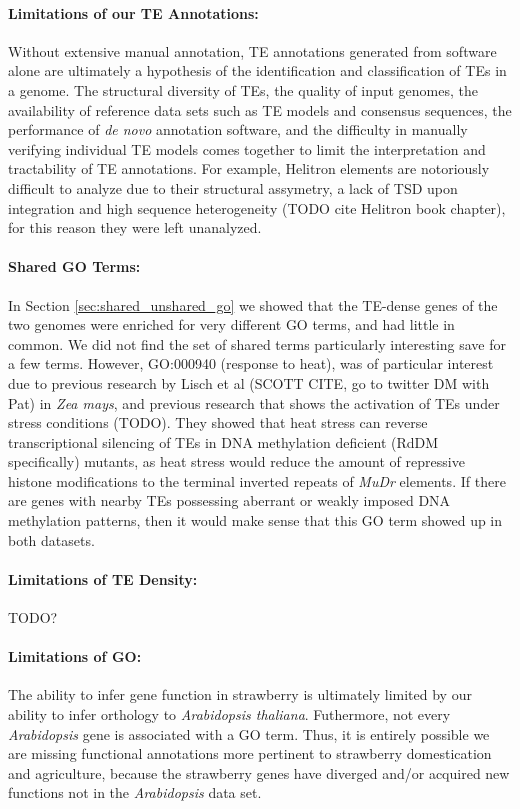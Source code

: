 \documentclass[fleqn,10pt]{olplainarticle}
\begin{document}
\paragraph{Limitations of our TE Annotations:}
Without extensive manual annotation, TE annotations generated from software alone are ultimately a hypothesis of the identification and classification of TEs in a genome.
The structural diversity of TEs, the quality of input genomes, the availability of reference data sets such as TE models and consensus sequences, the performance of \textit{de novo} annotation software, and the difficulty in manually verifying individual TE models comes together to limit the interpretation and tractability of TE annotations. 
For example, Helitron elements are notoriously difficult to analyze due to their structural assymetry, a lack of TSD upon integration and high sequence heterogeneity (TODO cite Helitron book chapter), for this reason they were left unanalyzed.

\paragraph{Shared GO Terms:}
In Section \ref{sec:shared_unshared_go} we showed that the TE-dense genes of the two genomes were enriched for very different GO terms, and had little in common.
We did not find the set of shared terms particularly interesting save for a few terms.
However, GO:000940 (response to heat), was of particular interest due to previous research by Lisch et al (SCOTT CITE, go to twitter DM with Pat) in \textit{Zea mays}, and previous research that shows the activation of TEs under stress conditions (TODO).
They showed that heat stress can reverse transcriptional silencing of TEs in DNA methylation deficient (RdDM specifically) mutants, as heat stress would reduce the amount of repressive histone modifications to the terminal inverted repeats of \textit{MuDr} elements.
If there are genes with nearby TEs possessing aberrant or weakly imposed DNA methylation patterns, then it would make sense that this GO term showed up in both datasets.


\paragraph{Limitations of TE Density:}
TODO?

\paragraph{Limitations of GO:}
The ability to infer gene function in strawberry is ultimately limited by our ability to infer orthology to \textit{Arabidopsis thaliana}.
Futhermore, not every \textit{Arabidopsis} gene is associated with a GO term.
Thus, it is entirely possible we are missing functional annotations more pertinent to strawberry domestication and agriculture, because the strawberry genes have diverged and/or acquired new functions not in the \textit{Arabidopsis} data set.
\end{document}
